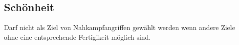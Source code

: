 \subsection{Schönheit}

Darf nicht als Ziel von Nahkampfangriffen gewählt werden wenn andere Ziele ohne eine entsprechende Fertigikeit möglich sind.